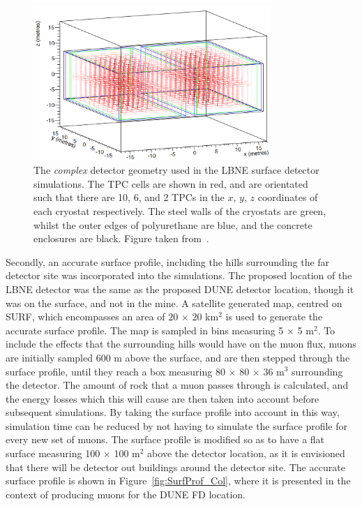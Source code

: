 \begin{figure}
  \centering
  \includegraphics[width=0.8\textwidth]{ComplexGeom}
  \caption[The \emph{complex} detector geometry used in the LBNE surface detector simulations]
          {The \emph{complex} detector geometry used in the LBNE surface detector simulations. The TPC cells are shown in red, and are orientated such that there are 10, 6, and 2 TPCs in the $x$, $y$, $z$ coordinates of each cryostat respectively. The steel walls of the cryostats are green, whilst the outer edges of polyurethane are blue, and the concrete enclosures are black. Figure taken from~\citep{MartinsThesis}.}
  \label{fig:SurfCompGeom}
\end{figure}

Secondly, an accurate surface profile, including the hills surrounding the far detector site was incorporated into the simulations. The proposed location of the LBNE detector was the same as the proposed DUNE detector location, though it was on the surface, and not in the mine. A satellite generated map, centred on SURF, which encompasses an area of 20 $\times$ 20 km$^2$ is used to generate the accurate surface profile. The map is sampled in bins measuring 5 $\times$ 5 m$^2$. To include the effects that the surrounding hills would have on the muon flux, muons are initially sampled 600 m above the surface, and are then stepped through the surface profile, until they reach a box measuring 80 $\times$ 80 $\times$ 36 m$^3$ surrounding the detector. The amount of rock that a muon passes through is calculated, and the energy losses which this will cause are then taken into account before subsequent simulations. By taking the surface profile into account in this way, simulation time can be reduced by not having to simulate the surface profile for every new set of muons. The surface profile is modified so as to have a flat surface measuring 100 $\times$ 100 m$^2$ above the detector location, as it is envisioned that there will be detector out buildings around the detector site. The accurate surface profile is shown in Figure~\ref{fig:SurfProf_Col}, where it is presented in the context of producing muons for the DUNE FD location. \\

